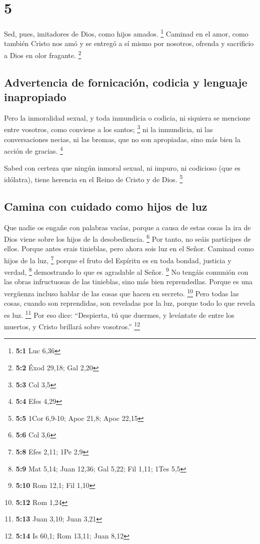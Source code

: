 \hypertarget{section-4}{%
\section{5}\label{section-4}}

 Sed, pues, imitadores de Dios, como hijos amados.
\footnote{\textbf{5:1} Luc 6,36}  Caminad en el amor, como
también Cristo nos amó y se entregó a sí mismo por nosotros, ofrenda y
sacrificio a Dios en olor fragante. \footnote{\textbf{5:2} Éxod 29,18;
  Gal 2,20}

\hypertarget{advertencia-de-fornicaciuxf3n-codicia-y-lenguaje-inapropiado}{%
\subsection{Advertencia de fornicación, codicia y lenguaje
inapropiado}\label{advertencia-de-fornicaciuxf3n-codicia-y-lenguaje-inapropiado}}

 Pero la inmoralidad sexual, y toda inmundicia o codicia,
ni siquiera se mencione entre vosotros, como conviene a los santos;
\footnote{\textbf{5:3} Col 3,5}  ni la inmundicia, ni las
conversaciones necias, ni las bromas, que no son apropiadas, sino más
bien la acción de gracias. \footnote{\textbf{5:4} Efes 4,29}

 Sabed con certeza que ningún inmoral sexual, ni impuro,
ni codicioso (que es idólatra), tiene herencia en el Reino de Cristo y
de Dios. \footnote{\textbf{5:5} 1Cor 6,9-10; Apoc 21,8; Apoc 22,15}

\hypertarget{camina-con-cuidado-como-hijos-de-luz}{%
\subsection{Camina con cuidado como hijos de
luz}\label{camina-con-cuidado-como-hijos-de-luz}}

 Que nadie os engañe con palabras vacías, porque a causa
de estas cosas la ira de Dios viene sobre los hijos de la desobediencia.
\footnote{\textbf{5:6} Col 3,6}  Por tanto, no seáis
partícipes de ellos.  Porque antes erais tinieblas, pero
ahora sois luz en el Señor. Caminad como hijos de la luz, \footnote{\textbf{5:8}
  Efes 2,11; 1Pe 2,9}  porque el fruto del Espíritu es en
toda bondad, justicia y verdad, \footnote{\textbf{5:9} Mat 5,14; Juan
  12,36; Gal 5,22; Fil 1,11; 1Tes 5,5}  demostrando lo
que es agradable al Señor. \footnote{\textbf{5:10} Rom 12,1; Fil 1,10}
 No tengáis comunión con las obras infructuosas de las
tinieblas, sino más bien reprendedlas.  Porque es una
vergüenza incluso hablar de las cosas que hacen en secreto. \footnote{\textbf{5:12}
  Rom 1,24}  Pero todas las cosas, cuando son
reprendidas, son reveladas por la luz, porque todo lo que revela es luz.
\footnote{\textbf{5:13} Juan 3,10; Juan 3,21}  Por eso
dice: ``Despierta, tú que duermes, y levántate de entre los muertos, y
Cristo brillará sobre vosotros.'' \footnote{\textbf{5:14} Is 60,1; Rom
  13,11; Juan 8,12}

